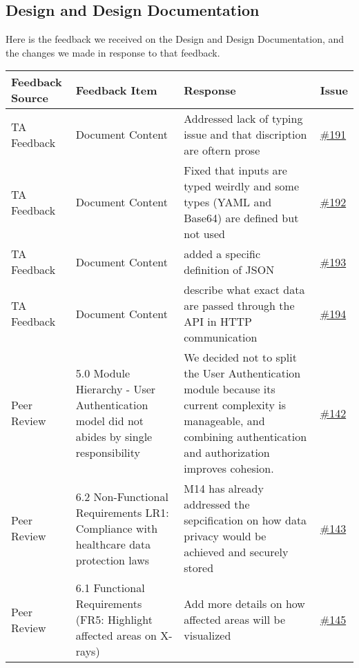 \documentclass{article}
\begin{document}
\begin{longtable}{| p{} | p{} | p{} | p{} |}
    

\end{longtable}

\subsection{Design and Design Documentation}

Here is the feedback we received on the Design and Design Documentation, and the changes we made in response to that feedback.
\begin{longtable}{| p{} | p{} | p{} | p{} |}
\hline
\textbf{Feedback Source} & \textbf{Feedback Item} & \textbf{Response} & \textbf{Issue} \\
\hline
TA Feedback & Document Content & Addressed lack of typing issue and that discription are oftern prose  & \href{https://github.com/RezaJodeiri/CXR-Capstone/issues/191}{\#191} \\
\hline
TA Feedback & Document Content & Fixed that inputs are typed weirdly and some types (YAML and Base64) are defined but not used & \href{https://github.com/RezaJodeiri/CXR-Capstone/issues/192}{\#192} \\
\hline
TA Feedback & Document Content & added a specific definition of JSON & \href{https://github.com/RezaJodeiri/CXR-Capstone/issues/193}{\#193} \\
\hline
TA Feedback & Document Content & describe what exact data are passed through the API in HTTP communication & \href{https://github.com/RezaJodeiri/CXR-Capstone/issues/194}{\#194} \\
\hline
Peer Review & 5.0 Module Hierarchy - User Authentication model did not abides by single responsibility & We decided not to split the User Authentication module because its current complexity is manageable, and combining authentication and authorization improves cohesion. &\href{https://github.com/RezaJodeiri/CXR-Capstone/issues/142}{\#142}\\
\hline
Peer Review & 6.2 Non-Functional Requirements LR1: Compliance with healthcare data protection laws & M14 has already addressed the sepcification on how data privacy would be achieved and securely stored & \href{https://github.com/RezaJodeiri/CXR-Capstone/issues/143}{\#143}\\
\hline
Peer Review & 6.1 Functional Requirements (FR5: Highlight affected areas on X-rays) & Add more details on how affected areas will be visualized & \href{https://github.com/RezaJodeiri/CXR-Capstone/issues/145}{\#145}
\hline
\end{longtable}
\end{document}

